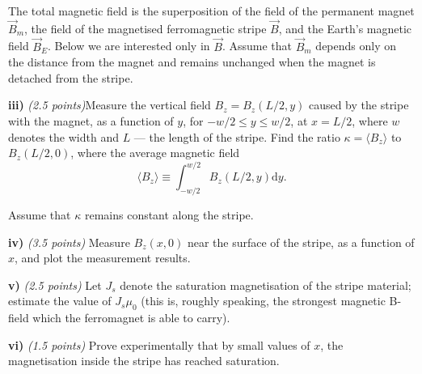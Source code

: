 The total magnetic field is the superposition of the field of the permanent
magnet $\vec{B}_m$, the field of the magnetised ferromagnetic stripe $\vec{B}$,
and the Earth's magnetic field $\vec{B}_E$. Below we are interested only in
$\vec{B}$. Assume that $\vec{B}_m$ depends only on the distance from the magnet
and remains unchanged when the magnet is detached from the stripe.

\textbf{iii)} \textit{(2.5 points)}Measure the vertical field
$B_z = B_z(L/2{,}y)$ caused by the stripe with the magnet, as a function of $y$,
for $-w/2 \leq y \leq w/2$, at $x = L/2$, where $w$ denotes the width and $L$
--- the length of the stripe. Find the ratio $\kappa = \langle B_z\rangle$ to
$B_z(L/2{,}0)$, where the average magnetic field
\[
\langle B_z\rangle \equiv \int_{-w/2}^{w/2} B_z(L/2{,}y)\mathrm{d}y.
\]

Assume that $\kappa$ remains constant along the stripe.

\textbf{iv)} \textit{(3.5 points)} Measure $B_z(x{,}0)$ near the surface of the
stripe, as a function of $x$, and plot the measurement results.

\textbf{v)} \textit{(2.5 points)} Let $J_s$ denote the saturation magnetisation
of the stripe material; estimate the value of $J_s\mu_0$ (this is, roughly
speaking, the strongest magnetic B-field which the ferromagnet is able to
carry).

\textbf{vi)} \textit{(1.5 points)} Prove experimentally that by small values of
$x$, the magnetisation inside the stripe has reached saturation.
